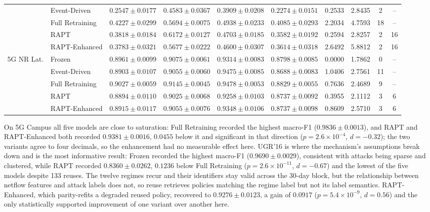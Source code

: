 \documentclass[conference]{IEEEtran}
\begin{document}
\begin{table}[t]
\begin{tabular}{@{}llcccccccc@{}}
 & Event-Driven    & $0.2547 \pm 0.0177$ & $0.4583 \pm 0.0367$ & $0.3909 \pm 0.0208$ & $0.2274 \pm 0.0151$ & 0.2533 & 2.8435 & 2 & -- \\
 & Full Retraining & $\mathbf{0.4227 \pm 0.0299}$ & $0.5694 \pm 0.0075$ & $0.4938 \pm 0.0233$ & $0.4085 \pm 0.0293$ & 2.2034 & 4.7593 & 18 & -- \\
 & RAPT            & $0.3818 \pm 0.0184$ & $\mathbf{0.6172 \pm 0.0127}$ & $0.4703 \pm 0.0185$ & $0.3582 \pm 0.0192$ & 0.2594 & 2.8257 & 2 & 16 \\
 & RAPT-Enhanced   & $0.3783 \pm 0.0321$ & $0.5677 \pm 0.0222$ & $0.4600 \pm 0.0307$ & $0.3614 \pm 0.0318$ & 2.6492 & 5.8812 & 2 & 16 \\
\midrule
\multirow{5}{*}{5G NR Lat.}
 & Frozen          & $0.8961 \pm 0.0099$ & $0.9075 \pm 0.0061$ & $0.9314 \pm 0.0083$ & $0.8798 \pm 0.0085$ & 0.0000 & 1.7862 & 0 & -- \\
 & Event-Driven    & $0.8903 \pm 0.0107$ & $0.9055 \pm 0.0060$ & $0.9475 \pm 0.0085$ & $0.8688 \pm 0.0083$ & 1.0406 & 2.7561 & 11 & -- \\
 & Full Retraining & $\mathbf{0.9027 \pm 0.0059}$ & $0.9145 \pm 0.0045$ & $0.9478 \pm 0.0053$ & $0.8829 \pm 0.0055$ & 0.7636 & 2.4689 & 9 & -- \\
 & RAPT            & $0.8894 \pm 0.0110$ & $0.9025 \pm 0.0068$ & $0.9258 \pm 0.0103$ & $0.8737 \pm 0.0092$ & 0.3955 & 2.1112 & 3 & 6 \\
 & RAPT-Enhanced   & $0.8915 \pm 0.0117$ & $0.9055 \pm 0.0076$ & $0.9348 \pm 0.0106$ & $0.8737 \pm 0.0098$ & 0.8609 & 2.5710 & 3 & 6 \\
\bottomrule
\end{tabular}
\end{table}

On 5G Campus all five models are close to saturation: Full Retraining recorded the
highest macro-F1 ($0.9836 \pm 0.0013$), and RAPT and RAPT-Enhanced both recorded
$0.9381 \pm 0.0016$, $0.0455$ below it and significant in that direction
($p = 2.6 \times 10^{-4}$, $d = -0.32$); the two variants agree to four decimals, so
the enhancement had no measurable effect here. UGR'16 is where the
mechanism's assumptions break down and is the most informative result: Frozen
recorded the highest macro-F1 ($0.9690 \pm 0.0029$), consistent with attacks being
sparse and clustered, while RAPT recorded $0.8360 \pm 0.0262$, $0.1236$ below Full
Retraining ($p = 2.6 \times 10^{-11}$, $d = -0.67$) and the lowest of the five
models despite 133 reuses. The twelve regimes recur and their identifiers stay valid
across the 30-day block, but the relationship between netflow features and attack
labels does not, so reuse retrieves policies matching the regime label but not its
label semantics. RAPT-Enhanced, which parity-refits a degraded reused policy,
recovered to $0.9276 \pm 0.0123$, a gain of $0.0917$
($p = 5.4 \times 10^{-9}$, $d = 0.56$) and the only statistically supported
improvement of one variant over another here.
\end{document}
